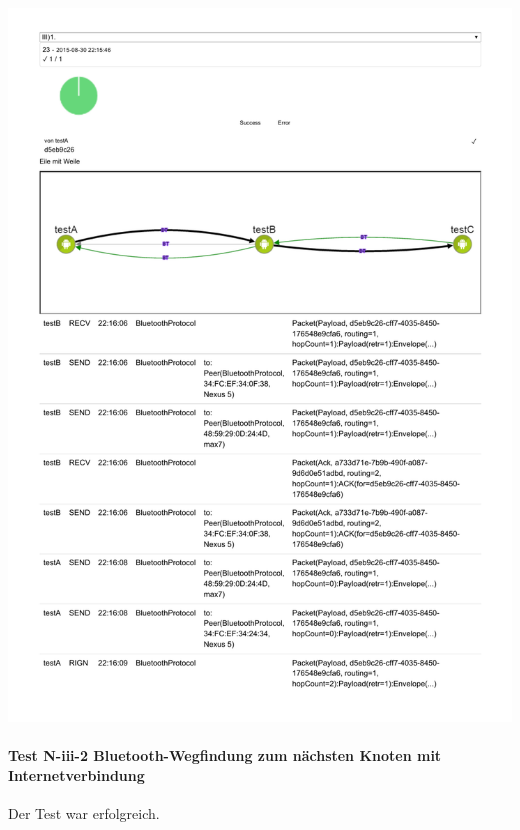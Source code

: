 \includegraphics[trim=0 100 0 0,clip,scale=0.8]{belege/manuelle-tests/netzwerk/Dashboardauszuege/Netzwerktest_III-1.pdf}
\clearpage

\paragraph{Test N-iii-2 Bluetooth-Wegfindung zum nächsten Knoten mit Internetverbindung}

Der Test war erfolgreich.

